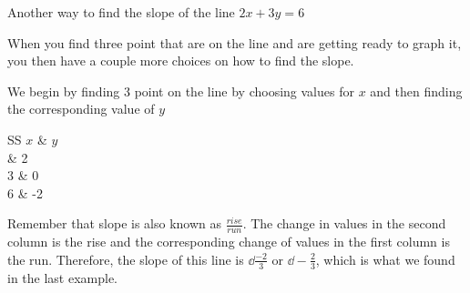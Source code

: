 \begin{myexample}
Another way to find the slope of the line $2x+3y=6$
\end{myexample}
\begin{myProof}
	When you find three point that are on the line and are getting ready to graph it, you
	then have a couple more choices on how to find the slope. 
																							
	We begin by finding 3 point on the line by choosing values for $x$ and then finding the corresponding
	value of $y$
	\begin{tightcenter}
		\begin{tabular}{SS}
			\toprule
            {$x$} & {$y$}  \\
			 & 2  \\
			3 & 0  \\
			6 & -2 \\
			\bottomrule
		\end{tabular}
	\end{tightcenter}
	Remember that slope is also known as $\frac{rise}{run}$. The change in values in the second
	column is the rise and the corresponding change of values in the first column is the run. Therefore, 
	the slope of this line is $\dd\frac{-2}{3}$ or $\dd-\frac{2}{3}$, which is what we found in the last example.
\end{myProof}
									
